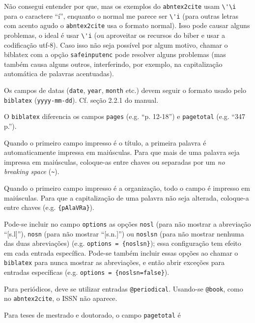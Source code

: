 \documentclass[a4paper]{article}
\begin{document}
\begin{itemize}
  \begin{sloppypar}
  \item Não consegui entender por que, mas os exemplos do
    \texttt{abntex2cite} usam \verb"\'\i" para o caractere ``í'', enquanto o
    normal me parece ser \verb"\'i" (para outras letras com acento agudo o
    \texttt{abntex2cite} usa o formato normal). Isso pode causar alguns
    problemas, o ideal é usar \verb"\'i" (ou aproveitar os recursos do biber
    e usar a codificação utf-8). Caso isso não seja possível por algum
    motivo, chamar o biblatex com a opção \texttt{safeinputenc} pode
    resolver alguns problemas (mas também causa alguns outros, interferindo,
    por exemplo, na capitalização automática de palavras acentuadas).
  \item Os campos de datas (\texttt{date}, \texttt{year}, \texttt{month} etc.)
    devem seguir o formato usado pelo \texttt{biblatex} (\texttt{yyyy-mm-dd}).
    Cf. seção 2.2.1 do manual.
  \item O \texttt{biblatex} diferencia os campos \texttt{pages} (e.g. ``p.
    12-18'') e \texttt{pagetotal} (e.g. ``347 p.'').
  \item Quando o primeiro campo impresso é o título, a primeira palavra é
    automaticamente impressa em maiúsculas. Para que mais de uma palavra seja
    impressa em maiúsculas, coloque-as entre chaves ou separadas por um
    \emph{no breaking space} (\verb"~").
  \item Quando o primeiro campo impresso é a organização, todo o campo é
    impresso em maiúsculas. Para que a capitalização de uma palavra não
    seja alterada, coloque-a entre chaves (e.g. \verb"{pAlaVRa}").
  \item Pode-se incluir no campo \texttt{options} as opções \texttt{nosl}
    (para não mostrar a abreviação ``[s.l]''), \texttt{nosn} (para não
    mostrar ``[s.n.]'') ou \texttt{noslsn} (para não mostrar nenhuma das duas
    abreviações) (e.g. \texttt{options = \{noslsn\}}); essa configuração
    tem efeito em cada entrada específica. Pode-se também incluir essas
    opções
    ao chamar o \texttt{biblatex} para nunca mostrar as abreviações, e
    então abrir exceções para entradas específicas (e.g. \texttt{options =
    \{noslsn=false\}}).
  \item Para periódicos, deve se utilizar entradas \texttt{@periodical}.
    Usando-se \texttt{@book}, como no \texttt{abntex2cite}, o ISSN não
    aparece.
  \item Para teses de mestrado e doutorado, o campo \texttt{pagetotal} é

\end{sloppypar}
\end{itemize}
\end{document}
